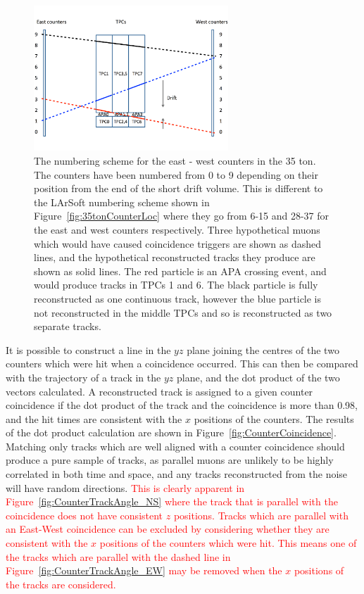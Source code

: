 \begin{figure}
  \centering
  \includegraphics[width=0.65\textwidth]{CounterSchematic}
  \caption[The numbering scheme for the east - west counters in the 35 ton]
          {The numbering scheme for the east - west counters in the 35 ton. The counters have been numbered from 0 to 9 depending on their position from the end of the short drift volume. This is different to the LArSoft numbering scheme shown in Figure~\ref{fig:35tonCounterLoc} where they go from 6-15 and 28-37 for the east and west counters respectively. Three hypothetical muons which would have caused coincidence triggers are shown as dashed lines, and the hypothetical reconstructed tracks they produce are shown as solid lines. The red particle is an APA crossing event, and would produce tracks in TPCs 1 and 6. The black particle is fully reconstructed as one continuous track, however the blue particle is not reconstructed in the middle TPCs and so is reconstructed as two separate tracks.}
  \label{fig:EWCounters}
\end{figure}

It is possible to construct a line in the $yz$ plane joining the centres of the two counters which were hit when a coincidence occurred. This can then be compared with the trajectory of a track in the $yz$ plane, and the dot product of the two vectors calculated. A reconstructed track is assigned to a given counter coincidence if the dot product of the track and the coincidence is more than 0.98, and the hit times are consistent with the $x$ positions of the counters. The results of the dot product calculation are shown in Figure~\ref{fig:CounterCoincidence}. Matching only tracks which are well aligned with a counter coincidence should produce a pure sample of tracks, as parallel muons are unlikely to be highly correlated in both time and space, and any tracks reconstructed from the noise will have random directions. \textcolor{red}{This is clearly apparent in Figure~\ref{fig:CounterTrackAngle_NS} where the track that is parallel with the coincidence does not have consistent $z$ positions. Tracks which are parallel with an East-West coincidence can be excluded by considering whether they are consistent with the $x$ positions of the counters which were hit. This means one of the tracks which are parallel with the dashed line in Figure~\ref{fig:CounterTrackAngle_EW} may be removed when the $x$ positions of the tracks are considered.} \\  

